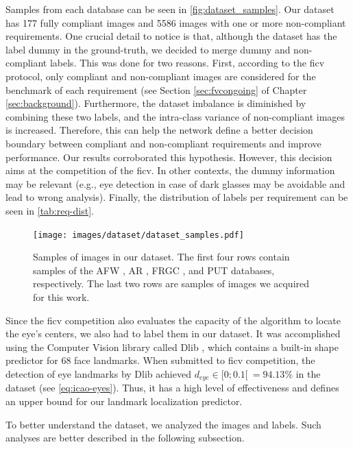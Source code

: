Samples from each database can be seen in \autoref{fig:dataset_samples}. Our dataset has 177 fully compliant images and 5586 images with one or more non-compliant requirements. One crucial detail to notice is that, although the \adhoc dataset has the label dummy in the ground-truth, we decided to merge dummy and non-compliant labels. This was done for two reasons. First, according to the \acs{ficv} protocol, only compliant and non-compliant images are considered for the benchmark of each requirement (see Section \ref{sec:fvcongoing} of Chapter \ref{sec:background}). Furthermore, the dataset imbalance is diminished by combining these two labels, and the intra-class variance of non-compliant images is increased. Therefore, this can help the network define a better decision boundary between compliant and non-compliant requirements and improve performance. Our results corroborated this hypothesis. However, this decision aims at the competition of the \acs{ficv}. In other contexts, the dummy information may be relevant (e.g., eye detection in case of dark glasses may be avoidable and lead to wrong analysis). Finally, the distribution of labels per requirement can be seen in \autoref{tab:req-dist}. 
 
\begin{figure}[tb]
\centering
\texttt{[image: images/dataset/dataset\_samples.pdf]}
\caption{Samples of images in our dataset. The first four rows contain samples of the AFW \citep{databaseAFW}, AR \citep{martinez1998ar}, FRGC \citep{databaseFRGC}, and PUT \citep{kasinski2008put} databases, respectively. The last two rows are samples of images we acquired for this work.}
\label{fig:dataset_samples}
\end{figure}
 

 
Since the \acs{ficv} competition also evaluates the capacity of the algorithm to locate the eye's centers, we also had to label them in our \adhoc dataset. It was accomplished using the Computer Vision library called Dlib \citep{dlib}, which contains a built-in shape predictor for 68 face landmarks. When submitted to \acs{ficv} competition, the detection of eye landmarks by Dlib achieved $d_{eye} \in [0;0.1[\ = 94.13\%$ in the \ficvtest dataset (see \autoref{eq:icao-eyes}). Thus, it has a high level of effectiveness and defines an upper bound for our landmark localization predictor.
 
To better understand the \adhoc dataset, we analyzed the images and labels. Such analyses are better described in the following subsection.
 
